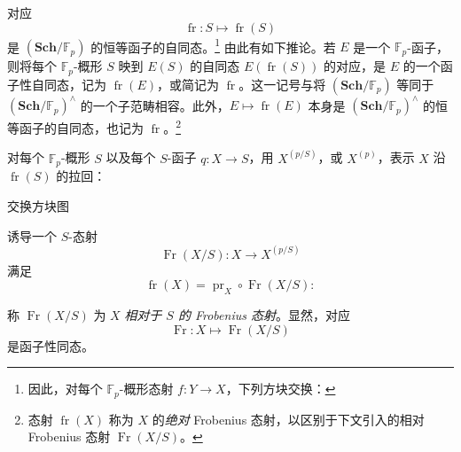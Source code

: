 对应
\[
  \operatorname{fr}:S\longmapsto\operatorname{fr}(S)
\]
是 \((\mathbf{Sch}/\mathbb F_p)\) 的恒等函子的自同态。\footnote{因此，对每个 \(\mathbb F_p\)-概形态射 \(f:Y\to X\)，下列方块交换：
\par\noindent\parbox{\linewidth}{%
  \centering
  
  \par\vspace*{\baselineskip}
  \vspace*{\baselineskip}
}\par}
由此有如下推论。若 \(E\) 是一个 \(\mathbb F_p\)-函子，则将每个 \(\mathbb F_p\)-概形 \(S\) 映到 \(E(S)\) 的自同态 \(E(\operatorname{fr}(S))\) 的对应，是 \(E\) 的一个函子性自同态，记为 \(\operatorname{fr}(E)\)，或简记为 \(\operatorname{fr}\)。这一记号与将 \((\mathbf{Sch}/\mathbb F_p)\) 等同于 \((\mathbf{Sch}/\mathbb F_p)^\wedge\) 的一个子范畴相容。此外，\(E\mapsto\operatorname{fr}(E)\) 本身是 \((\mathbf{Sch}/\mathbb F_p)^\wedge\) 的恒等函子的自同态，也记为 \(\operatorname{fr}\)。\footnote{态射 \(\operatorname{fr}(X)\) 称为 \(X\) 的\emph{绝对} Frobenius 态射，以区别于下文引入的相对 Frobenius 态射 \(\operatorname{Fr}(X/S)\)。}

对每个 \(\mathbb F_p\)-概形 \(S\) 以及每个 \(S\)-函子 \(q:X\to S\)，用 \(X^{(p/S)}\)，或 \(X^{(p)}\)，表示 \(X\) 沿 \(\operatorname{fr}(S)\) 的拉回：
\begin{center}
  \label{sga3:VIIA:4.1-frobenius-basechange-square}
  
\end{center}

交换方块图
\begin{center}
  \label{sga3:VIIA:4.1-absolute-frobenius-square}
  
\end{center}
诱导一个 \(S\)-态射
\[
  \operatorname{Fr}(X/S):X\longrightarrow X^{(p/S)}
\]
满足
\[
  \operatorname{fr}(X)
  =
  \operatorname{pr}_X\circ\operatorname{Fr}(X/S):
\]
\begin{center}
  \label{sga3:VIIA:4.1-relative-frobenius-factorization}
  
\end{center}
称 \(\operatorname{Fr}(X/S)\) 为 \(X\) \emph{相对于 \(S\) 的 Frobenius 态射}。显然，对应
\[
  \operatorname{Fr}:X\longmapsto\operatorname{Fr}(X/S)
\]
是函子性同态。

